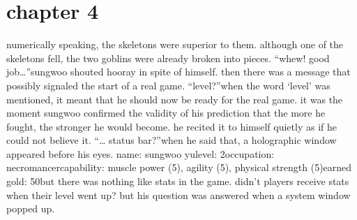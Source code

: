 \section{chapter 4}






numerically speaking, the skeletons were superior to them.
 although one of the skeletons fell, the two goblins were already broken into pieces.
“whew! good job…”sungwoo shouted hooray in spite of himself.
 then there was a message that possibly signaled the start of a real game.
“level?”when the word ‘level’ was mentioned, it meant that he should now be ready for the real game.
it was the moment sungwoo confirmed the validity of his prediction that the more he fought, the stronger he would become.
 he recited it to himself quietly as if he could not believe it.
“… status bar?”when he said that, a holographic window appeared before his eyes.
name: sungwoo yulevel: 2occupation: necromancercapability: muscle power (5), agility (5), physical strength (5)earned gold: 50but there was nothing like stats in the game.
 didn’t players receive stats when their level went up? but his question was answered when a system window popped up.

